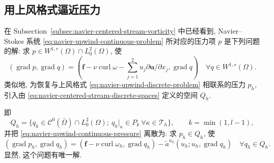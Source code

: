 \subsection{用上风格式逼近压力}
\label{subsec:navier-upwind-pressure}

在 Subsection~\ref{subsec:navier-centered-stream-vorticity} 中已经看到,
Navier--Stokes 系统 \eqref{eq:navier-upwind-continuous-problem} 所对应的压力项 $p$
是下列问题的解: 求 $p\in W^{1,r}(\Omega)\cap L_0^2(\Omega)$, 使
\begin{equation}\label{eq:navier-upwind-continuous-pressure}
(\operatorname{grad}p,\operatorname{grad}q)
=\left(\boldsymbol f-\nu\operatorname{curl}\omega
-\sum_{j=1}^2u_j\partial\boldsymbol u/\partial x_j,
\operatorname{grad}q\right)
\quad\forall q\in W^{1,s}(\Omega).
\end{equation}
类似地, 为恢复与上风格式 \eqref{eq:navier-upwind-discrete-problem} 相联系的压力 $p_h$,
引入由 \eqref{eq:navier-centered-stream-discrete-spaces} 定义的空间 $Q_h$.

即
\begin{equation}\label{eq:navier-upwind-pressure-space}
Q_h=\{q_h\in\mathcal C^0(\bar\Omega)\cap L_0^2(\Omega);
\ q_h|_\kappa\in P_k\ \forall\kappa\in\mathcal T_h\},
\qquad k=\min(1,l-1),
\end{equation}
并把 \eqref{eq:navier-upwind-continuous-pressure} 离散为: 求 $p_h\in Q_h$, 使
\begin{equation}\label{eq:navier-upwind-discrete-pressure}
(\operatorname{grad}p_h,\operatorname{grad}q_h)
=(\boldsymbol f-\nu\operatorname{curl}\omega_h,
\operatorname{grad}q_h)
-\widetilde a^{u_h}(u_h;u_h,\operatorname{grad}q_h)
\quad\forall q_h\in Q_h.
\end{equation}
显然, 这个问题有唯一解.

